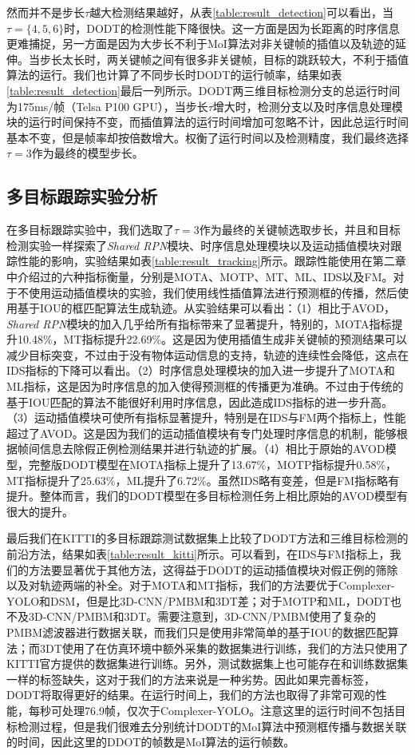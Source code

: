 然而并不是步长$\tau$越大检测结果越好，从表\ref{table:result_detection}可以看出，当$\tau = \{4,5,6\}$时，DODT的检测性能下降很快。这一方面是因为长距离的时序信息更难捕捉，另一方面是因为大步长不利于MoI算法对非关键帧的插值以及轨迹的延伸。当步长太长时，两关键帧之间有很多非关键帧，目标的跳跃较大，不利于插值算法的运行。我们也计算了不同步长时DODT的运行帧率，结果如表\ref{table:result_detection}最后一列所示。DODT两三维目标检测分支的总运行时间为175ms/帧（Telsa P100 GPU），当步长$\tau$增大时，检测分支以及时序信息处理模块的运行时间保持不变，而插值算法的运行时间增加可忽略不计，因此总运行时间基本不变，但是帧率却按倍数增大。权衡了运行时间以及检测精度，我们最终选择$\tau = 3$作为最终的模型步长。

\subsection{多目标跟踪实验分析}
\label{mot_result}


在多目标跟踪实验中，我们选取了$\tau = 3$作为最终的关键帧选取步长，并且和目标检测实验一样探索了\textit{Shared RPN}模块、时序信息处理模块以及运动插值模块对跟踪性能的影响，实验结果如表\ref{table:result_tracking}所示。跟踪性能使用在第二章中介绍过的六种指标衡量，分别是MOTA、MOTP、MT、ML、IDS以及FM。对于不使用运动插值模块的实验，我们使用线性插值算法进行预测框的传播，然后使用基于IOU的框匹配算法生成轨迹。从实验结果可以看出：（1）相比于AVOD，\textit{Shared RPN}模块的加入几乎给所有指标带来了显著提升，特别的，MOTA指标提升10.48\%，MT指标提升22.69\%。这是因为使用插值生成非关键帧的预测结果可以减少目标突变，不过由于没有物体运动信息的支持，轨迹的连续性会降低，这点在IDS指标的下降可以看出。（2）时序信息处理模块的加入进一步提升了MOTA和ML指标，这是因为时序信息的加入使得预测框的传播更为准确。不过由于传统的基于IOU匹配的算法不能很好利用时序信息，因此造成IDS指标的进一步升高。（3）运动插值模块可使所有指标显著提升，特别是在IDS与FM两个指标上，性能超过了AVOD。这是因为我们的运动插值模块有专门处理时序信息的机制，能够根据帧间信息去除假正例检测结果并进行轨迹的扩展。（4）相比于原始的AVOD模型，完整版DODT模型在MOTA指标上提升了13.67\%，MOTP指标提升0.58\%，MT指标提升了25.63\%，ML提升了6.72\%。虽然IDS略有变差，但是FM指标略有提升。整体而言，我们的DODT模型在多目标检测任务上相比原始的AVOD模型有很大的提升。



最后我们在KITTI的多目标跟踪测试数据集上比较了DODT方法和三维目标检测的前沿方法，结果如表\ref{table:result_kitti}所示。可以看到，在IDS与FM指标上，我们的方法要显著优于其他方法，这得益于DODT的运动插值模块对假正例的筛除以及对轨迹两端的补全。对于MOTA和MT指标，我们的方法要优于Complexer-YOLO和DSM，但是比3D-CNN/PMBM和3DT差；对于MOTP和ML，DODT也不及3D-CNN/PMBM和3DT。需要注意到，3D-CNN/PMBM使用了复杂的PMBM滤波器进行数据关联，而我们只是使用非常简单的基于IOU的数据匹配算法；而3DT使用了在仿真环境中额外采集的数据集进行训练，我们的方法只使用了KITTI官方提供的数据集进行训练。另外，测试数据集上也可能存在和训练数据集一样的标签缺失，这对于我们的方法来说是一种劣势。因此如果完善标签，DODT将取得更好的结果。在运行时间上，我们的方法也取得了非常可观的性能，每秒可处理76.9帧，仅次于Complexer-YOLO。注意这里的运行时间不包括目标检测过程，但是我们很难去分别统计DODT的MoI算法中预测框传播与数据关联的时间，因此这里的DDOT的帧数是MoI算法的运行帧数。

